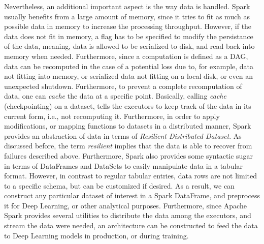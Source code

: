 Nevertheless, an additional important aspect is the way data is handled. Spark usually benefits from a large amount of memory, since it tries to fit as much as possible data in memory to increase the processing throughput. However, if the data does not fit in memory, a flag has to be specified to modify the persistance of the data, meaning, data is allowed to be serialized to disk, and read back into memory when needed. Furthermore, since a computation is defined as a DAG, data can be recomputed in the case of a potential loss due to, for example, data not fitting into memory, or serialized data not fitting on a local disk, or even an unexpected shutdown. Furthermore, to prevent a complete recomputation of data, one can \emph{cache} the data at a specific point. Basically, calling \emph{cache} (checkpointing) on a dataset, tells the executors to keep track of the data in its current form, i.e., not recomputing it. Furthermore, in order to apply modifications, or mapping functions to datasets in a distributed manner, Spark provides an abstraction of data in terms of \emph{Resilient Distributed Dataset}. As discussed before, the term \emph{resilient} implies that the data is able to recover from failures described above. Furthermore, Spark also provides some syntactic sugar in terms of DataFrames and DataSets to easily manipulate data in a tabular format. However, in contrast to regular tabular entries, data rows are not limited to a specific schema, but can be customized if desired. As a result, we can construct any particular dataset of interest in a Spark DataFrame, and preprocess it for Deep Learning, or other analytical purposes. Furthermore, since Apache Spark provides several utilities to distribute the data among the executors, and stream the data were needed, an architecture can be constructed to feed the data to Deep Learning models in production, or during training.\\


